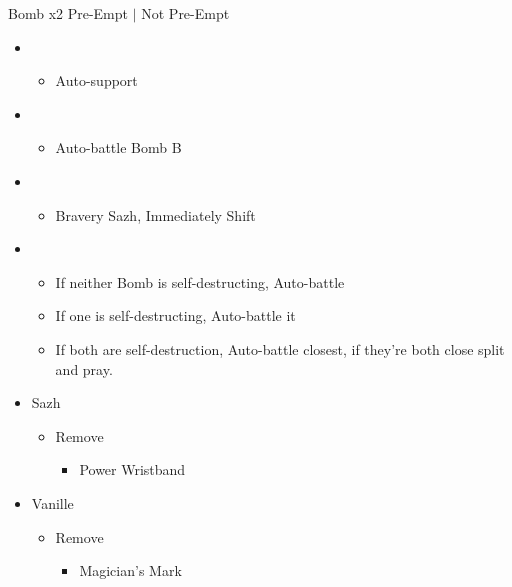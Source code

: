 \begin{battle}{Bomb x2 Pre-Empt $|$ Not Pre-Empt}
\begin{multicols}{2}
\begin{itemize}
    \item \second
    \begin{itemize}
        \item Auto-support
    \end{itemize}
    \item \first
    \begin{itemize}
        \item Auto-battle Bomb B
    \end{itemize}
\end{itemize}
\columnbreak
\begin{itemize}
    \item \second
    \begin{itemize}
        \item Bravery Sazh, Immediately Shift
    \end{itemize}
    \item \first
    \begin{itemize}
        \item If neither Bomb is self-destructing, Auto-battle
        \item If one is self-destructing, Auto-battle it
		\item If both are self-destruction, Auto-battle closest, if they're both close split and pray.
    \end{itemize}
\end{itemize}
\end{multicols}
\end{battle}

\begin{menu}
\begin{itemize}
    \equip
    \begin{itemize}
        \item Sazh
        \begin{itemize}
            \item Remove
            \begin{itemize}
                \item Power Wristband
            \end{itemize}
        \end{itemize}
        \item Vanille
        \begin{itemize}
            \item Remove
            \begin{itemize}
                \item Magician's Mark
            \end{itemize}
        \end{itemize}
    \end{itemize}
\end{itemize}
\end{menu}





